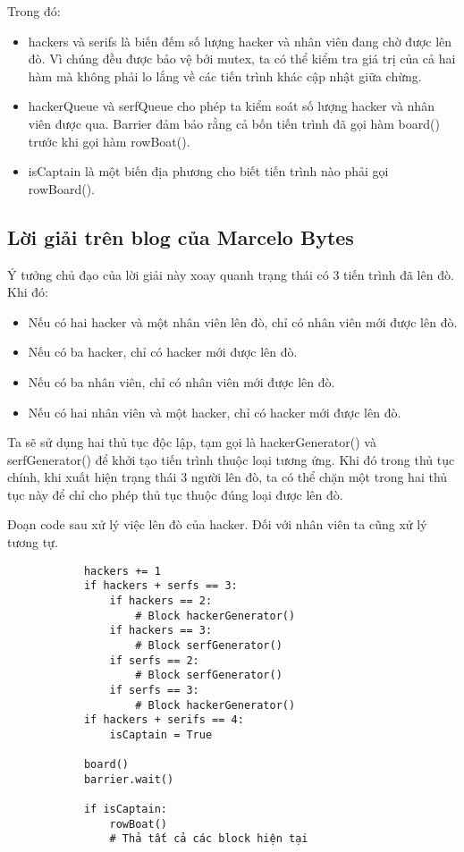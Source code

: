 \documentclass[a4paper]{article}
\begin{document}
	Trong đó:

	\begin{itemize}
		\item {hackers và serifs là biến đếm số lượng hacker và nhân viên đang chờ được lên đò.
			Vì chúng đều được bảo vệ bởi mutex, ta có thể kiểm tra giá trị của cả hai hàm mà 
			không phải lo lắng về các tiến trình khác cập nhật giữa chừng.}
		\item {hackerQueue và serfQueue cho phép ta kiểm soát số lượng hacker và nhân viên được 
			qua. Barrier đảm bảo rằng cả bốn tiến trình đã gọi hàm board() trước khi gọi hàm 
			rowBoat().}
		\item {isCaptain là một biến địa phương cho biết tiến trình nào phải gọi rowBoard().}
	\end{itemize}
	
	\subsection{Lời giải trên blog của Marcelo Bytes\cite{bytes}}
	Ý tưởng chủ đạo của lời giải này xoay quanh trạng thái có 3 tiến trình đã 
	lên đò. Khi đó:

	\begin{itemize}
		\item {Nếu có hai hacker và một nhân viên lên đò, chỉ có nhân viên mới được lên đò.}
		\item {Nếu có ba hacker, chỉ có hacker mới được lên đò.}
		\item {Nếu có ba nhân viên, chỉ có nhân viên mới được lên đò.}
		\item {Nếu có hai nhân viên và một hacker, chỉ có hacker mới được lên đò.}
	\end{itemize}

	Ta sẽ sử dụng hai thủ tục độc lập, tạm gọi là hackerGenerator() và 
	serfGenerator() để khởi tạo tiến trình thuộc loại tương ứng. Khi đó trong
	thủ tục chính, khi xuất hiện trạng thái 3 người lên đò, ta có thể chặn một
	trong hai thủ tục này để chỉ cho phép thủ tục thuộc đúng loại được lên đò.

	Đoạn code sau xử lý việc lên đò của hacker. Đối với nhân viên ta cũng xử lý tương tự.

	\begin{tcolorbox}
		\begin{verbatim}
			hackers += 1
			if hackers + serfs == 3: 
			    if hackers == 2:
			        # Block hackerGenerator()
			    if hackers == 3:
			        # Block serfGenerator()
			    if serfs == 2:
			        # Block serfGenerator()
			    if serfs == 3:
					# Block hackerGenerator()
			if hackers + serifs == 4:
			    isCaptain = True
			
			board() 
			barrier.wait() 
			
			if isCaptain: 
			    rowBoat() 
			    # Thả tất cả các block hiện tại
		\end{verbatim}
	\end{tcolorbox}
\end{document}
